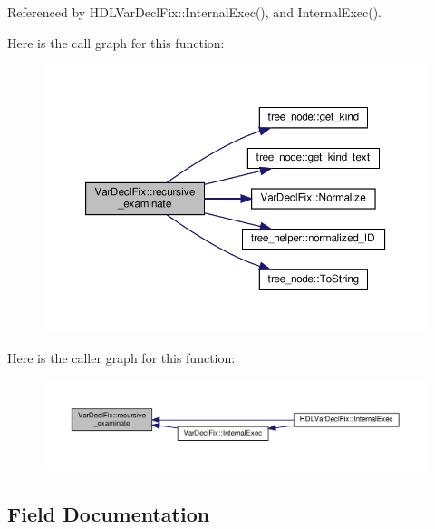 Referenced by H\+D\+L\+Var\+Decl\+Fix\+::\+Internal\+Exec(), and Internal\+Exec().

Here is the call graph for this function\+:
\nopagebreak
\begin{figure}[H]
\begin{center}
\leavevmode
\includegraphics[width=350pt]{db/d32/classVarDeclFix_a97f89fbe958790b6ae93d617e2b7686c_cgraph}
\end{center}
\end{figure}
Here is the caller graph for this function\+:
\nopagebreak
\begin{figure}[H]
\begin{center}
\leavevmode
\includegraphics[width=350pt]{db/d32/classVarDeclFix_a97f89fbe958790b6ae93d617e2b7686c_icgraph}
\end{center}
\end{figure}


\subsection{Field Documentation}
\mbox{\label{classVarDeclFix_a38ff6b42820b7feb6218edd5a031d473}} 
